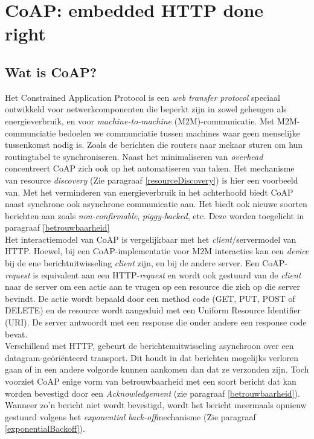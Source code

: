 \chapter{CoAP: embedded HTTP done right} \label{CoAP}

\section{Wat is CoAP?}

Het Constrained Application Protocol is een \textit{web transfer protocol} speciaal ontwikkeld voor netwerkcomponenten die beperkt zijn in zowel geheugen als energieverbruik, en voor \textit{machine-to-machine} (M2M)-communicatie. Met M2M-communciatie bedoelen we communciatie tussen machines waar geen menselijke tussenkomst nodig is. Zoals de berichten die routers naar mekaar sturen om hun routingtabel te synchroniseren. Naast het minimaliseren van \textit{overhead} concentreert CoAP zich ook op het automatiseren van taken. Het mechanisme van resource \textit{discovery} (Zie paragraaf \ref{resourceDiscovery}) is hier een voorbeeld van. Met het verminderen van energieverbruik in het achterhoofd biedt CoAP naast synchrone ook asynchrone communicatie aan. Het biedt ook nieuwe soorten berichten aan zoals \textit{non-confirmable}, \textit{piggy-backed}, etc. Deze worden toegelicht in paragraaf \ref{betrouwbaarheid}\\


Het interactiemodel van CoAP is vergelijkbaar met het \textit{client}/servermodel van HTTP. Hoewel, bij een CoAP-implementatie voor M2M interacties kan een \textit{device} bij de ene berichtuitwisseling \textit{client} zijn, en bij de andere server. Een CoAP-\textit{request} is equivalent aan een HTTP-\textit{request} en wordt ook gestuurd van de \textit{client} naar de server om een actie aan te vragen op een resource die zich op die server bevindt. De actie wordt bepaald door een method code (GET, PUT, POST of DELETE) en de resource wordt aangeduid met een Uniform Resource Identifier (URI). De server antwoordt met een response die onder andere een response code bevat.\\

Verschillend met HTTP, gebeurt de berichtenuitwisseling asynchroon over een datagram-ge\"{o}ri\"{e}nteerd transport. Dit houdt in dat berichten mogelijks verloren gaan of in een andere volgorde kunnen aankomen dan dat ze verzonden zijn. Toch voorziet CoAP enige vorm van betrouwbaarheid met een soort bericht dat kan worden bevestigd door een \textit{Acknowledgement} (zie paragraaf \ref{betrouwbaarheid}). Wanneer zo'n bericht niet wordt bevestigd, wordt het bericht meermaals opnieuw gestuurd volgens het \textit{exponential back-off}mechanisme (Zie paragraaf \ref{exponentialBackoff}).

